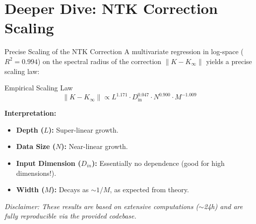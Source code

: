 \documentclass{beamer}
\begin{document}
\section{Deeper Dive: NTK Correction Scaling}

\begin{frame}{Precise Scaling of the NTK Correction}
A multivariate regression in log-space ($R^2=0.994$) on the spectral radius of the correction $\|K - K_\infty\|$ yields a precise scaling law:

\begin{alertblock}{Empirical Scaling Law}
\[
\|K - K_\infty\| \propto L^{1.171} \cdot D_{\text{in}}^{0.047} \cdot N^{0.900} \cdot M^{-1.009}
\]
\end{alertblock}

\textbf{Interpretation:}
\begin{itemize}
    \item \textbf{Depth ($L$):} Super-linear growth.
    \item \textbf{Data Size ($N$):} Near-linear growth.
    \item \textbf{Input Dimension ($D_{in}$):} Essentially no dependence (good for high dimensions!).
    \item \textbf{Width ($M$):} Decays as $\sim 1/M$, as expected from theory.
\end{itemize}

\vfill
\tiny{\textit{Disclaimer: These results are based on extensive computations ($\sim$24h) and are fully reproducible via the provided codebase.}}

\end{frame}
\end{document}
